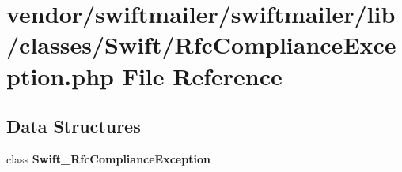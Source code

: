 \section{vendor/swiftmailer/swiftmailer/lib/classes/\+Swift/\+Rfc\+Compliance\+Exception.php File Reference}
\label{_rfc_compliance_exception_8php}
\subsection*{Data Structures}
\begin{DoxyCompactItemize}
\item 
class {\bf Swift\+\_\+\+Rfc\+Compliance\+Exception}
\end{DoxyCompactItemize}
